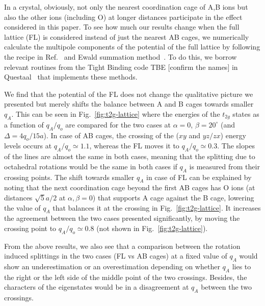 \documentclass[a4paper,prb]{revtex4-1}  %
\newcommand{\com}[1]{}
\newcommand{\az}[1]{{\color{magenta}{#1}}} %
\begin{document}
In a crystal, obviously, not only the nearest coordination cage of A,B ions but also
 the other ions (including O) at longer distances
  participate in the effect considered in this paper.
To see how much our results change when 
 the full lattice (FL) is considered instead of just the nearest AB cages,
we numerically calculate the multipole components of the potential
 of the full lattice by following the recipe in Ref.~\cite{PaxtonNotes, book?}
and Ewald summation method~\cite{Ewald}.
To do this, 
we borrow relevant routines from the Tight Binding code TBE [confirm the names] in Questaal~\cite{https://www.questaal.org/} that implements these methods.


\com{First,
FL does not preserve the cubic symmetry of the potential and the degeneracy of the t2g manifold 
is slightly lifted at zero rotations, i.e., for a cubic structure.
However, it is insignificant and we will not discuss it further.
What's more important is that the
potential of the full lattice does not change the qualitative picture we resented
but merely shifts the balance between A and B cages towards smaller $q_A$.
}

We find that the
potential of the FL does not change the qualitative picture we presented
but merely shifts the balance between A and B cages towards smaller $q_A$.
This can be seen in Fig.~\ref{fig:t2g-lattice}
where the energies of the $t_{2g}$ states as a function of $q_A/q_o$
are compared for the two cases
at $\alpha=0$, $\beta=20^\circ$ (and $\Delta=4q_o/15a$).
In case of AB cages, the crossing of the 
($xy$ and $yz/zx$)
energy levels occurs 
at $q_A/q_o\simeq1.1$,
whereas the FL moves it to $q_A/q_o\simeq0.3$.
The slopes of the lines are almost the same in both cases,
meaning that the splitting due to octahedral rotations 
would be the same in both cases if $q_A$ is measured 
from their crossing points.
The shift towards smaller $q_A$ in case of FL
can be explained by noting that
the next coordination cage beyond the first AB cages
has O ions
(at distances $\sqrt{5}a/2$ at $\alpha,\beta=0$) %
that supports A cage
against the B cage, lowering the value of $q_A$ that balances it
at the crossing in Fig.~\ref{fig:t2g-lattice}.
It increases the agreement between the two cases presented significantly,
by moving the crossing point 
to $q_A/q_o\simeq0.8$ (not shown in Fig.~\ref{fig:t2g-lattice}).

From the above results, we also see that
a comparison between the rotation induced splittings
 in the two
cases (FL vs AB cages)
at a fixed value of $q_A$
would show an underestimation or an overestimation 
depending on whether $q_A$ lies to the right or the left side of the 
middle point of the two crossings.
Besides, the characters of the eigenstates
would be in a disagreement at $q_A$
between the two crossings.
\end{document}
